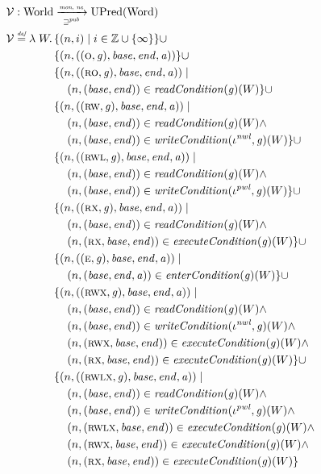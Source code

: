 \documentclass[a4paper]{article}
\newcommand{\defeq}{\stackrel{\textit{\tiny{def}}}{=}}
\newcommand{\union}{\mathbin{\cup}}
\newcommand{\var}[1]{\mathit{#1}}
\newcommand{\gl}{\var{g}}
\newcommand{\addr}{\var{a}}
\newcommand{\start}{\var{base}}
\newcommand{\addrend}{\var{end}}
\newcommand{\perm}{\var{perm}}
\newcommand{\stdcap}[1][(\perm,\gl)]{\left(#1,\start,\addrend,\addr \right)}
\newcommand{\nwl}{\var{nwl}}
\newcommand{\pwl}{\var{pwl}}
\newcommand{\plainfun}[2]{
  \ifthenelse{\equal{#2}{}}
  {\mathit{#1}}
  {\mathit{#1}(#2)}
}
\newcommand{\readCond}[1]{\plainfun{readCondition}{#1}}
\newcommand{\writeCond}[1]{\plainfun{writeCondition}{#1}}
\newcommand{\execCond}[1]{\plainfun{executeCondition}{#1}}
\newcommand{\entryCond}[1]{\plainfun{enterCondition}{#1}}
\newcommand{\futurewk}{\mathbin{\sqsupseteq}^{\var{pub}}}
\newcommand{\monwknefun}{\xrightarrow[\text{\tiny{$\futurewk$}}]{\textit{\tiny{mon, ne}}}}
\newcommand{\asmType}{\plaindom{AsmType}}
\newcommand{\plaindom}[1]{\mathrm{#1}}
\newcommand{\Words}{\plaindom{Word}}
\newcommand{\ints}{\mathbb{Z}}
\newcommand{\Worlds}{\plaindom{World}}
\newcommand{\UPred}[1]{\plaindom{UPred}(#1)}
\newcommand{\intr}[2]{\mathcal{#1}}
\newcommand{\valueintr}[1]{\intr{V}{#1}}
\newcommand{\stdvr}{\valueintr{\asmType}}
\newcommand{\npair}[2][n]{\left(#1,#2 \right)}
\newcommand{\plainperm}[1]{\textsc{#1}}
\newcommand{\noperm}{\plainperm{o}}
\newcommand{\readonly}{\plainperm{ro}}
\newcommand{\readwrite}{\plainperm{rw}}
\newcommand{\exec}{\plainperm{rx}}
\newcommand{\entry}{\plainperm{e}}
\newcommand{\rwx}{\plainperm{rwx}}
\newcommand{\readwritel}{\plainperm{rwl}}
\newcommand{\rwlx}{\plainperm{rwlx}}
\begin{document}
\begin{align*}
  &\stdvr : \Worlds \monwknefun \UPred{\Words} \\
  &\stdvr\defeq \lambda \; W \ldotp 
    \begin{aligned}[t]
      & \{ \npair{i} \mid i \in \ints \union \{ \infty \} \} 
      \union \\
      & \{ \npair{\stdcap[(\noperm,\gl)] }  \} 
      \union \\
      & \{ \npair{\stdcap[(\readonly,\gl)] } \mid \\
      & \quad \npair{(\start,\addrend)} \in \readCond{}(\gl)(W)\} 
      \union \\
      & \{ \npair{\stdcap[(\readwrite,\gl)] } \mid \\
      & \quad \npair{(\start,\addrend)} \in \readCond{}(\gl)(W) \land \\
      & \quad \npair{(\start,\addrend)} \in \writeCond{}(\iota^\nwl,\gl)(W) \}
      \union \\
      & \{ \npair{\stdcap[(\readwritel,\gl)] } \mid \\
      & \quad \npair{(\start,\addrend)} \in \readCond{}(\gl)(W) \land \\
      & \quad \npair{(\start,\addrend)} \in \writeCond{}(\iota^\pwl,\gl)(W) \}
      \union \\
      & \{ \npair{\stdcap[(\exec,\gl)]} \mid \\
      & \quad \npair{(\start,\addrend)} \in \readCond{}(\gl)(W) \land \\
      & \quad \npair{(\exec,\start,\addrend)} \in \execCond{}(\gl)(W) \} 
      \union \\
      & \{ \npair{\stdcap[(\entry,\gl)]} \mid \\
      & \quad \npair{(\start,\addrend,\addr)} \in \entryCond{}(\gl)(W)\} 
      \union \\
      & \{ \npair{\stdcap[(\rwx,\gl)]} \mid \\
      & \quad \npair{(\start,\addrend)} \in \readCond{}(\gl)(W) \land \\
      & \quad \npair{(\start,\addrend)} \in \writeCond{}(\iota^\nwl,\gl)(W) \land\\
      & \quad \npair{(\rwx,\start,\addrend)} \in \execCond{}(\gl)(W)  \land \\
      & \quad \npair{(\exec,\start,\addrend)} \in \execCond{}(\gl)(W) \}
      \union \\
      & \{ \npair{\stdcap[(\rwlx,\gl)]} \mid \\
      & \quad \npair{(\start,\addrend)} \in \readCond{}(\gl)(W) \land \\
      & \quad \npair{(\start,\addrend)} \in \writeCond{}(\iota^\pwl,\gl)(W) \land\\
      & \quad \npair{(\rwlx,\start,\addrend)} \in \execCond{}(\gl)(W) \land \\
      & \quad \npair{(\rwx,\start,\addrend)} \in \execCond{}(\gl)(W) \land \\
      & \quad \npair{(\exec,\start,\addrend)} \in \execCond{}(\gl)(W) \}
    \end{aligned}
\end{align*}
\end{document}
